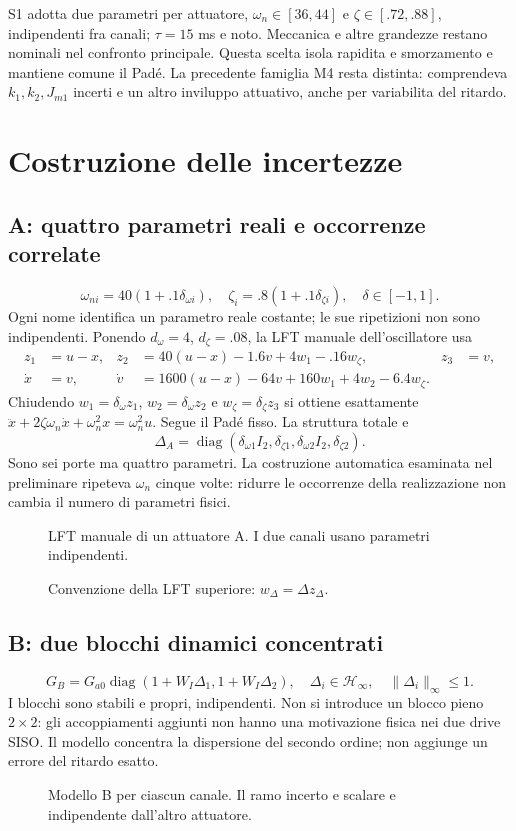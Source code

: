 \documentclass[11pt,a4paper,oneside]{report}
\newcommand{\schema}[2]{\begin{figure}[htbp]\centering\resizebox{.95\linewidth}{!}{}\caption{#2}\end{figure}}
\begin{document}
S1 adotta due parametri per attuatore, $\omega_n\in[36,44]$ e
$\zeta\in[.72,.88]$, indipendenti fra canali; $\tau=15$ ms e noto.
Meccanica e altre grandezze restano nominali nel confronto principale.
Questa scelta isola rapidita e smorzamento e mantiene comune il Padé.
La precedente famiglia M4 resta distinta: comprendeva $k_1,k_2,J_{m1}$
incerti e un altro inviluppo attuativo, anche per variabilita del ritardo.

\chapter{Costruzione delle incertezze}
\section{A: quattro parametri reali e occorrenze correlate}
\[
\omega_{ni}=40(1+.1\delta_{\omega i}),\quad
\zeta_i=.8(1+.1\delta_{\zeta i}),\quad\delta\in[-1,1].
\]
Ogni nome identifica un parametro reale costante; le sue ripetizioni non
sono indipendenti. Ponendo $d_\omega=4$, $d_\zeta=.08$, la LFT manuale
dell'oscillatore usa
\begin{align*}
z_1&=u-x,& z_2&=40(u-x)-1.6v+4w_1-.16w_\zeta,& z_3&=v,\\
\dot x&=v,&\dot v&=1600(u-x)-64v+160w_1+4w_2-6.4w_\zeta.
\end{align*}
Chiudendo $w_1=\delta_\omega z_1$, $w_2=\delta_\omega z_2$ e
$w_\zeta=\delta_\zeta z_3$ si ottiene esattamente
$\ddot x+2\zeta\omega_n\dot x+\omega_n^2x=\omega_n^2u$.
Segue il Padé fisso. La struttura totale e
\[
\Delta_A=\operatorname{diag}(\delta_{\omega1}I_2,\delta_{\zeta1},
\delta_{\omega2}I_2,\delta_{\zeta2}).
\]
Sono sei porte ma quattro parametri. La costruzione automatica esaminata
nel preliminare ripeteva $\omega_n$ cinque volte: ridurre le occorrenze
della realizzazione non cambia il numero di parametri fisici.
\schema{parametrico}{LFT manuale di un attuatore A. I due canali usano parametri indipendenti.}
\schema{lft}{Convenzione della LFT superiore: $w_\Delta=\Delta z_\Delta$.}
\section{B: due blocchi dinamici concentrati}
\[
G_B=G_{a0}\operatorname{diag}(1+W_I\Delta_1,1+W_I\Delta_2),\quad
\Delta_i\in\mathcal H_\infty,\quad\|\Delta_i\|_\infty\le1.
\]
I blocchi sono stabili e propri, indipendenti. Non si introduce un blocco
pieno $2\times2$: gli accoppiamenti aggiunti non hanno una motivazione
fisica nei due drive SISO. Il modello concentra la dispersione del secondo
ordine; non aggiunge un errore del ritardo esatto.
\schema{concentrato}{Modello B per ciascun canale. Il ramo incerto e scalare e indipendente dall'altro attuatore.}
\end{document}
